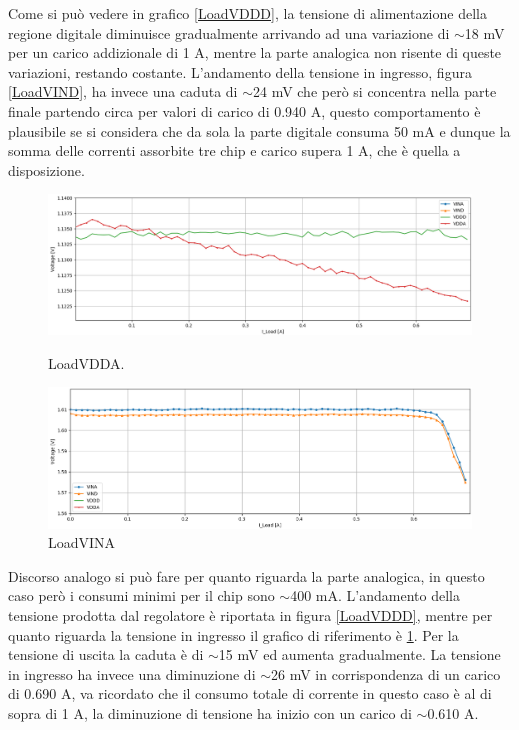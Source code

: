 Come si può vedere in grafico \ref{LoadVDDD}, la tensione di alimentazione della regione digitale diminuisce gradualmente arrivando ad una variazione di $\sim$18 mV per un carico addizionale di 1 A, mentre la parte analogica non risente di queste variazioni, restando costante. 
L'andamento della tensione in ingresso, figura \ref{LoadVIND}, ha invece una caduta di $\sim$24 mV che però si concentra nella parte finale partendo circa per valori di carico di 0.940 A, questo comportamento è plausibile se si considera che da sola la parte digitale consuma 50 mA e dunque la somma delle correnti assorbite tre chip e carico supera 1 A, che è quella a disposizione. 
\begin{figure}
\centering
\includegraphics[scale=.3]{Immagini/LoadVDDA}
\caption{LoadVDDA.}
\label{LoadVDDA}
\includegraphics[scale=.3]{Immagini/LoadVINA}
\caption{LoadVINA}
\label{LoadVINA}
\end{figure}
Discorso analogo si può fare per quanto riguarda la parte analogica, in questo caso però i consumi minimi per il chip sono $\sim$400 mA. L'andamento della tensione prodotta dal regolatore è riportata in figura \ref{LoadVDDD}, mentre per quanto riguarda la tensione in ingresso il grafico di riferimento è \ref{LoadVINA}. 
Per la tensione di uscita la caduta è di $\sim$15 mV ed aumenta gradualmente. La tensione in ingresso ha invece una diminuzione di $\sim$26 mV in corrispondenza di un carico di 0.690 A, va ricordato che il consumo totale di corrente in questo caso è al di sopra di 1 A, la diminuzione di tensione ha inizio con un carico di $\sim$0.610 A.

\afterpage{\clearpage}


